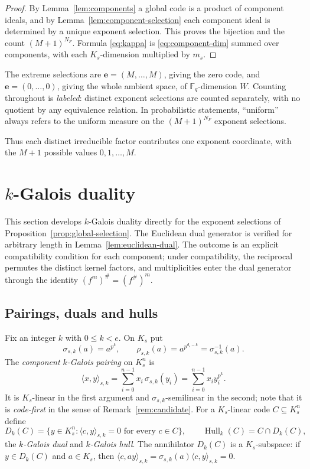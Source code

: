 \documentclass[11pt,a4paper]{article}
\newcommand{\F}{\mathbb F}
\newcommand{\Hull}{\operatorname{Hull}}
\newcommand{\Dk}{D_k}
\numberwithin{equation}{section}
\theoremstyle{plain}
\theoremstyle{definition}
\theoremstyle{remark}
\begin{document}
\begin{proof}
By Lemma~\ref{lem:components} a global code is a product of component ideals,
and by Lemma~\ref{lem:component-selection} each component ideal is determined
by a unique exponent selection.  This proves the bijection and the count
$(M+1)^{N_F}$.  Formula \eqref{eq:kappa} is \eqref{eq:component-dim} summed
over components, with each $K_s$-dimension multiplied by $m_s$.
\end{proof}

The extreme selections are $\mathbf{e}=(M,\ldots,M)$, giving the zero code, and
$\mathbf{e}=(0,\ldots,0)$, giving the whole ambient space, of $\F_q$-dimension
$W$.  Counting throughout is \emph{labeled}: distinct exponent selections are
counted separately, with no quotient by any equivalence relation.  In
probabilistic statements, ``uniform'' always refers to the uniform measure on
the $(M+1)^{N_F}$ exponent selections.

Thus each distinct irreducible factor contributes one exponent coordinate,
with the $M+1$ possible values $0,1,\ldots,M$.

\section{\texorpdfstring{$k$}{k}-Galois duality}\label{sec:duality}

This section develops $k$-Galois duality directly for the exponent
selections of Proposition~\ref{prop:global-selection}.  The Euclidean dual
generator is verified for arbitrary length in
Lemma~\ref{lem:euclidean-dual}.  The outcome is an explicit compatibility
condition for each component; under compatibility, the reciprocal permutes
the distinct kernel factors, and multiplicities enter the dual generator
through the identity $(f^m)^{\#}=(f^{\#})^m$.

\subsection{Pairings, duals and hulls}\label{sec:pairing}

Fix an integer $k$ with $0\leq k<e$.  On $K_s$ put
\[
\sigma_{s,k}(a)=a^{p^k},\qquad
\rho_{s,k}(a)=a^{p^{d_s-k}}=\sigma_{s,k}^{-1}(a).
\]
The \emph{component $k$-Galois pairing} on $K_s^n$ is
\begin{equation}\label{eq:pairing}
\langle x,y\rangle_{s,k}
   =\sum_{i=0}^{n-1}x_i\,\sigma_{s,k}(y_i)
   =\sum_{i=0}^{n-1}x_i y_i^{p^k}.
\end{equation}
It is $K_s$-linear in the first argument and $\sigma_{s,k}$-semilinear in the
second; note that it is \emph{code-first} in the sense of
Remark~\ref{rem:candidate}.  For a $K_s$-linear code $C\subseteq K_s^n$ define
\[
\Dk(C)=\bigl\{y\in K_s^n:\langle c,y\rangle_{s,k}=0
 \text{ for every }c\in C\bigr\},
\qquad
\Hull_k(C)=C\cap\Dk(C),
\]
the \emph{$k$-Galois dual} and \emph{$k$-Galois hull}.  The annihilator
$\Dk(C)$ is a $K_s$-subspace: if $y\in\Dk(C)$ and $a\in K_s$, then
$\langle c,ay\rangle_{s,k}=\sigma_{s,k}(a)\langle c,y\rangle_{s,k}=0$.
\end{document}
